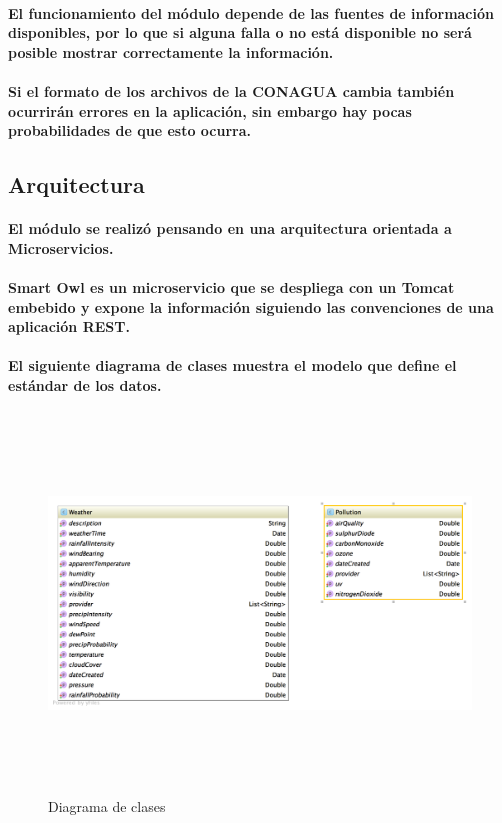     \paragraph{El funcionamiento del módulo depende de las fuentes de información disponibles, por lo que si alguna falla o no está disponible no será posible mostrar correctamente la información.}
    \paragraph{Si el formato de los archivos de la CONAGUA cambia también ocurrirán errores en la aplicación, sin embargo hay pocas probabilidades de que esto ocurra.}

  \subsection{Arquitectura}
    \paragraph{El módulo se realizó pensando en una arquitectura orientada a Microservicios.}
    \paragraph{Smart Owl es un microservicio que se despliega con un Tomcat embebido y expone la información siguiendo las convenciones de una aplicación REST.}

    \paragraph{El siguiente diagrama de clases muestra el modelo que define el estándar de los datos.}
    \begin{figure}[b!]
      \begin{center}
        \includegraphics[width=14cm,height=10cm]{./images/SmartOwl_ClassDiagram}
        \caption{Diagrama de clases}
      \end{center}
    \end{figure}

